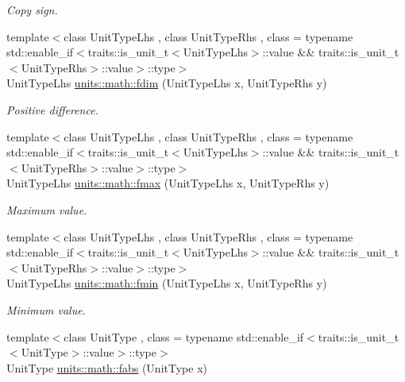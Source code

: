 \begin{DoxyCompactItemize}
\begin{DoxyCompactList}\small\item\em Copy sign. \end{DoxyCompactList}\item 
{\footnotesize template$<$class Unit\+Type\+Lhs , class Unit\+Type\+Rhs , class  = typename std\+::enable\+\_\+if$<$traits\+::is\+\_\+unit\+\_\+t$<$\+Unit\+Type\+Lhs$>$\+::value \&\& traits\+::is\+\_\+unit\+\_\+t$<$\+Unit\+Type\+Rhs$>$\+::value$>$\+::type$>$ }\\Unit\+Type\+Lhs \hyperlink{group___unit_math_gab460b2830c1621552bafcdea8d8bf3dd}{units\+::math\+::fdim} (Unit\+Type\+Lhs x, Unit\+Type\+Rhs y)
\begin{DoxyCompactList}\small\item\em Positive difference. \end{DoxyCompactList}\item 
{\footnotesize template$<$class Unit\+Type\+Lhs , class Unit\+Type\+Rhs , class  = typename std\+::enable\+\_\+if$<$traits\+::is\+\_\+unit\+\_\+t$<$\+Unit\+Type\+Lhs$>$\+::value \&\& traits\+::is\+\_\+unit\+\_\+t$<$\+Unit\+Type\+Rhs$>$\+::value$>$\+::type$>$ }\\Unit\+Type\+Lhs \hyperlink{group___unit_math_ga3d09f87ec3b994b8030925816e2741fe}{units\+::math\+::fmax} (Unit\+Type\+Lhs x, Unit\+Type\+Rhs y)
\begin{DoxyCompactList}\small\item\em Maximum value. \end{DoxyCompactList}\item 
{\footnotesize template$<$class Unit\+Type\+Lhs , class Unit\+Type\+Rhs , class  = typename std\+::enable\+\_\+if$<$traits\+::is\+\_\+unit\+\_\+t$<$\+Unit\+Type\+Lhs$>$\+::value \&\& traits\+::is\+\_\+unit\+\_\+t$<$\+Unit\+Type\+Rhs$>$\+::value$>$\+::type$>$ }\\Unit\+Type\+Lhs \hyperlink{group___unit_math_gad0e605e80e01d7c415a65a51299ede67}{units\+::math\+::fmin} (Unit\+Type\+Lhs x, Unit\+Type\+Rhs y)
\begin{DoxyCompactList}\small\item\em Minimum value. \end{DoxyCompactList}\item 
{\footnotesize template$<$class Unit\+Type , class  = typename std\+::enable\+\_\+if$<$traits\+::is\+\_\+unit\+\_\+t$<$\+Unit\+Type$>$\+::value$>$\+::type$>$ }\\Unit\+Type \hyperlink{group___unit_math_ga947e9084d1a8f0bb89292af70887216c}{units\+::math\+::fabs} (Unit\+Type x)

\end{DoxyCompactItemize}
